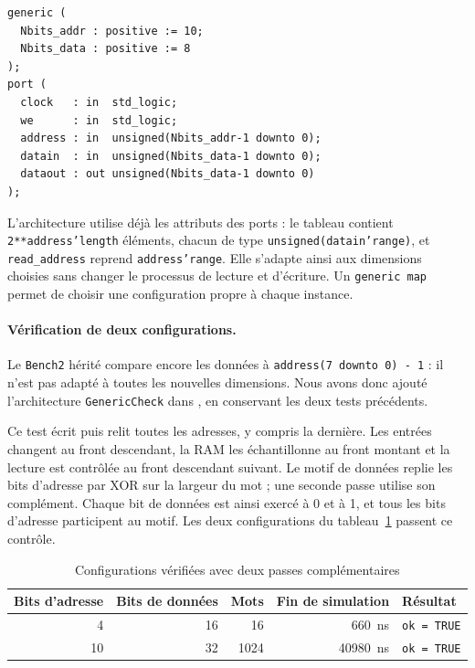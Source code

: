 \noindent\begin{minipage}{\linewidth}
\begin{lstlisting}[style=vhdl, caption={Paramètres et ports de la RAM générique}, label={lst:ram-generique}]
generic (
  Nbits_addr : positive := 10;
  Nbits_data : positive := 8
);
port (
  clock   : in  std_logic;
  we      : in  std_logic;
  address : in  unsigned(Nbits_addr-1 downto 0);
  datain  : in  unsigned(Nbits_data-1 downto 0);
  dataout : out unsigned(Nbits_data-1 downto 0)
);
\end{lstlisting}
\end{minipage}\par

L'architecture utilise déjà les attributs des ports : le tableau contient
\texttt{2**address'length} éléments, chacun de type \texttt{unsigned(datain'range)}, et
\texttt{read\_address} reprend \texttt{address'range}. Elle s'adapte ainsi aux dimensions
choisies sans changer le processus de lecture et d'écriture. Un \texttt{generic map}
permet de choisir une configuration propre à chaque instance.

\paragraph{Vérification de deux configurations.}
Le \texttt{Bench2} hérité compare encore les données à
\texttt{address(7 downto 0) - 1} : il n'est pas adapté à toutes les nouvelles dimensions.
Nous avons donc ajouté l'architecture \texttt{GenericCheck} dans
, en conservant les deux tests précédents.

Ce test écrit puis relit toutes les adresses, y compris la dernière. Les entrées changent
au front descendant, la RAM les échantillonne au front montant et la lecture est contrôlée
au front descendant suivant. Le motif de données replie les bits d'adresse par XOR sur
la largeur du mot ; une seconde passe utilise son complément. Chaque bit de données est
ainsi exercé à 0 et à 1, et tous les bits d'adresse participent au motif. Les deux
configurations du tableau~\ref{tab:ram-generiques} passent ce contrôle.

\begin{table}[H]
\centering
\begin{tabular}{rrrrl}
\toprule
Bits d'adresse & Bits de données & Mots & Fin de simulation & Résultat \\
\midrule
4 & 16 & 16 & 660~ns & \texttt{ok = TRUE} \\
10 & 32 & 1024 & 40980~ns & \texttt{ok = TRUE} \\
\bottomrule
\end{tabular}
\caption{Configurations vérifiées avec deux passes complémentaires}
\label{tab:ram-generiques}
\end{table}

